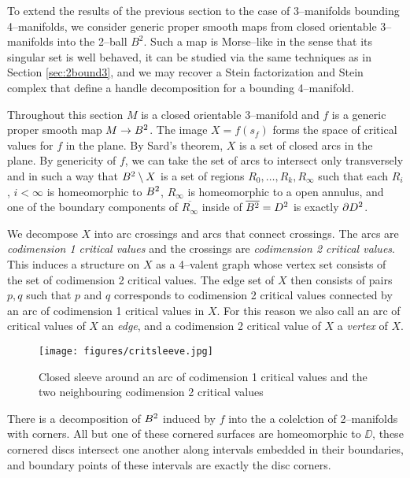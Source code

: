 \label{sec:3bound4}

To extend the results of the previous section to the case of 3--manifolds bounding 4--manifolds, we consider generic proper smooth maps from closed orientable 3--manifolds into the 2--ball $B^2$.
Such a map is Morse--like in the sense that its singular set is well behaved, it can be studied via the same techniques as in Section \ref{sec:2bound3}, and we may recover a Stein factorization and Stein complex that define a handle decomposition for a bounding 4--manifold.

Throughout this section $M$ is a closed orientable 3--manifold and $f$ is a generic proper smooth map $M\to B^2$.
The image $X=f(s_f)$ forms the space of critical values for $f$ in the plane.
By Sard's theorem, $X$ is a set of closed arcs in the plane.
By genericity of $f$, we can take the set of arcs to intersect only transversely and in such a way that $B^2\setminus X$ is a set of regions $R_0,\dots,R_k,R_\infty$ such that each $R_i$, $i<\infty$ is homeomorphic to $B^2$, $R_\infty$ is homeomorphic to a open annulus, and one of the boundary components of $\overline{R_\infty}$ inside of $\overline{B^2}=D^2$ is exactly $\partial D^2$.

We decompose $X$ into arc crossings and arcs that connect crossings.
The arcs are \emph{codimension 1 critical values} and the crossings are \emph{codimension 2 critical values}.
This induces a structure on $X$ as a 4--valent graph whose vertex set consists of the set of codimension 2 critical values.
The edge set of $X$ then consists of pairs $p,q$ such that $p$ and $q$ corresponds to codimension 2 critical values connected by an arc of codimension 1 critical values in $X$.
For this reason we also call an arc of critical values of $X$ an \emph{edge}, and a codimension 2 critical value of $X$ a \emph{vertex} of $X$.


\begin{figure}
	\centering
	\captionsetup{justification=centering}
	\caption{Closed sleeve around an arc of codimension 1 critical values and the two neighbouring codimension 2 critical values}
	\texttt{[image: figures/critsleeve.jpg]}
	\label{fig:critsleeve}
\end{figure}

\begin{lem}
	\label{lem:bbdecomp}
	There is a decomposition of $B^2$ induced by $f$ into the a colelction of 2--manifolds with corners. All but one of these cornered surfaces are homeomorphic to $\DD$, these cornered discs intersect one another along intervals embedded in their boundaries, and boundary points of these intervals are exactly the disc corners.
\end{lem}

